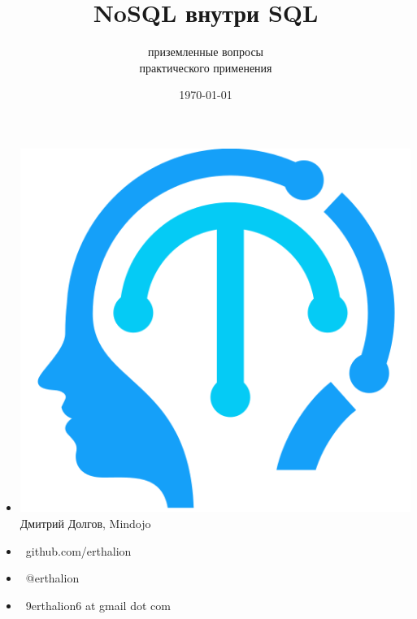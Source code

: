 \documentclass[18pt, compress, aspectratio=169]{beamer}
\title{NoSQL внутри SQL}
\subtitle{приземленные вопросы\\ практического применения}
\date{\today}
\institute{}
\def\twitter{{\FA \faTwitter}}
\def\github{{\FA \faGithubSign}}
\def\email{{\FA \faEnvelope}}
\begin{document}
{
  \fontsize{17pt}{18}\selectfont
  \maketitle
}

\fontsize{21pt}{23}\selectfont
\section{}

\begin{frame}{}
    \begin{itemize}[label={}]
        \item \includegraphics[scale=0.04]{mindojo_logo.png} Дмитрий Долгов, Mindojo
        \item {\github\ github.com/erthalion}
        \item {\twitter\ @erthalion}
        \item \email\ 9erthalion6 at gmail dot com
    \end{itemize}
\end{frame}
\end{document}
